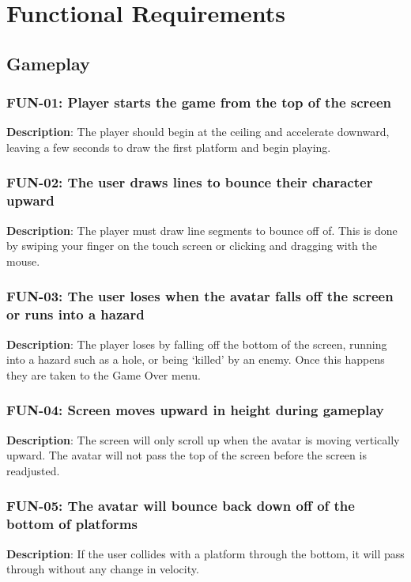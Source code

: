 \chapter{Functional Requirements}
\section{Gameplay}
\subsection{FUN-01: Player starts the game from the top of the screen}
\textbf{Description}: The player should begin at the ceiling and accelerate
downward, leaving a few seconds to draw the first platform and begin
playing.

\subsection{FUN-02: The user draws lines to bounce their character upward}
\textbf{Description}: The player must draw line segments to bounce
off of. This is done by swiping your finger on the touch screen or
clicking and dragging with the mouse.

\subsection{FUN-03: The user loses when the avatar falls off the screen or runs
into a hazard}
\textbf{Description}: The player loses by falling off the bottom of
the screen, running into a hazard such as a hole, or being \textquoteleft{}killed\textquoteright{}
by an enemy. Once this happens they are taken to the Game Over menu.

\subsection{FUN-04: Screen moves upward in height during gameplay}
\textbf{Description}: The screen will only scroll up when the avatar
is moving vertically upward. The avatar will not pass the top of the
screen before the screen is readjusted.

\subsection{FUN-05: The avatar will bounce back down off of the bottom of platforms}
\textbf{Description}: If the user collides with a platform through
the bottom, it will pass through without any change in velocity.

